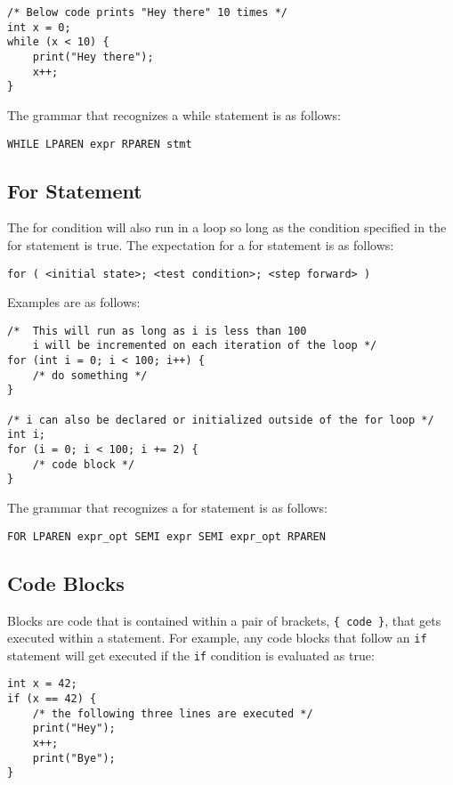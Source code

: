 \documentclass{article}
\begin{document}
\begin{lstlisting}
/* Below code prints "Hey there" 10 times */
int x = 0;
while (x < 10) {
	print("Hey there");
	x++;
}
\end{lstlisting}

The grammar that recognizes a while statement is as follows:
\begin{Verbatim}[frame=single]
WHILE LPAREN expr RPAREN stmt
\end{Verbatim}

\subsection{For Statement}
The for condition will also run in a loop so long as the condition specified in the for statement is true.  The expectation for a for statement is as follows:

\texttt{for ( <initial state>; <test condition>; <step forward> )}

Examples are as follows:

\begin{lstlisting}
/* 	This will run as long as i is less than 100
	i will be incremented on each iteration of the loop */
for (int i = 0; i < 100; i++) {
	/* do something */
}

/* i can also be declared or initialized outside of the for loop */
int i;
for (i = 0; i < 100; i += 2) {
	/* code block */
}
\end{lstlisting}

The grammar that recognizes a for statement is as follows:
\begin{Verbatim}[frame=single]
FOR LPAREN expr_opt SEMI expr SEMI expr_opt RPAREN
\end{Verbatim}

\subsection{Code Blocks}
Blocks are code that is contained within a pair of brackets, \texttt{\{ code \}}, that gets executed within a statement.  For example, any code blocks that follow an \texttt{if} statement will get executed if the \texttt{if} condition is evaluated as true:

\begin{lstlisting}
int x = 42;
if (x == 42) {
	/* the following three lines are executed */
	print("Hey");
	x++;
	print("Bye");
}
\end{lstlisting}
\end{document}
